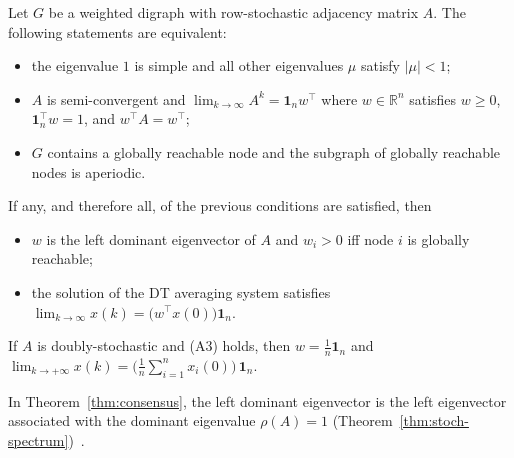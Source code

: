 \begin{theorem}
\label{thm:consensus}
Let $G$ be a weighted digraph with row-stochastic adjacency matrix $A$. The following
statements are equivalent:
\begin{itemize}
  \item[(A1)] the eigenvalue $1$ is simple and all other eigenvalues $\mu$ satisfy
              $|\mu| < 1$;
  \item[(A2)] $A$ is semi-convergent and
              $\lim_{k \to \infty} A^k = \mathbf{1}_n w^\top$ where
              $w \in \mathbb{R}^n$ satisfies $w \geq 0$,
              $\mathbf{1}_n^\top w = 1$, and $w^\top A = w^\top$;
  \item[(A3)] $G$ contains a globally reachable node and the subgraph of globally
              reachable nodes is aperiodic.
\end{itemize}
If any, and therefore all, of the previous conditions are satisfied, then
\begin{itemize}
  \item[(i)]  $w$ is the left dominant eigenvector of $A$ and $w_i > 0$ iff node $i$
              is globally reachable;
  \item[(ii)] the solution of the DT averaging system satisfies
              $\lim_{k \to \infty} x(k) = \big(w^\top x(0)\big)\mathbf{1}_n$.
\end{itemize}
\end{theorem}

\begin{corollary}
\label{cor:average}
If $A$ is doubly-stochastic and (A3) holds, then
$w = \frac{1}{n}\mathbf{1}_n$ and
$\lim_{k \to +\infty} x(k) = \big(\frac{1}{n}\sum_{i=1}^{n} x_i(0)\big)\, \mathbf{1}_n$.
\end{corollary}

In Theorem~\ref{thm:consensus}, the left dominant eigenvector is the left eigenvector
associated with the dominant eigenvalue $\rho(A) = 1$
(Theorem~\ref{thm:stoch-spectrum})~\cite{baggio_matrix}.

